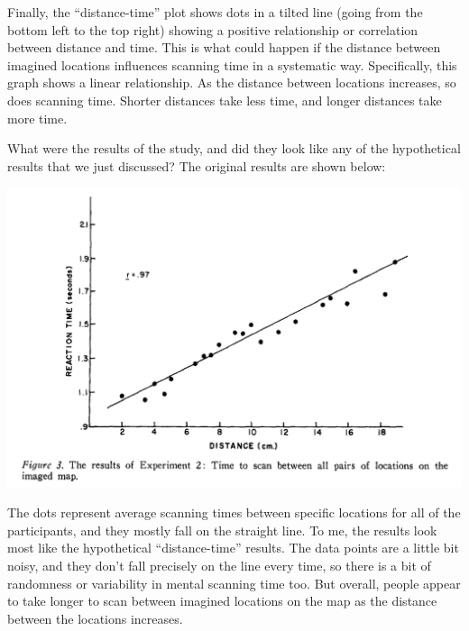 \documentclass[
  oneside,
  12pt]{crumpbook}
\begin{document}
Finally, the ``distance-time'' plot shows dots in a tilted line (going from the bottom left to the top right) showing a positive relationship or correlation between distance and time. This is what could happen if the distance between imagined locations influences scanning time in a systematic way. Specifically, this graph shows a linear relationship. As the distance between locations increases, so does scanning time. Shorter distances take less time, and longer distances take more time.

What were the results of the study, and did they look like any of the hypothetical results that we just discussed? The original results are shown below:

\includegraphics[width=1\linewidth]{imgs/KosslynEtAl1978Fig3}

The dots represent average scanning times between specific locations for all of the participants, and they mostly fall on the straight line. To me, the results look most like the hypothetical ``distance-time'' results. The data points are a little bit noisy, and they don't fall precisely on the line every time, so there is a bit of randomness or variability in mental scanning time too. But overall, people appear to take longer to scan between imagined locations on the map as the distance between the locations increases.
\end{document}
